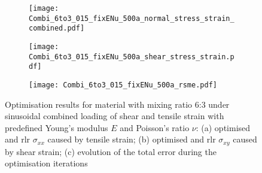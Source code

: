 \begin{figure}[H]
\centering
\begin{subfigure}[t]{0.495\textwidth}
    \centering
    \texttt{[image: Combi\_6to3\_015\_fixENu\_500a\_normal\_stress\_strain\_combined.pdf]}
    \caption{}
    \label{subfig:CombiTensileStressStrainCurve}
\end{subfigure}
\hfill
\begin{subfigure}[t]{0.495\textwidth}
    \centering
    \texttt{[image: Combi\_6to3\_015\_fixENu\_500a\_shear\_stress\_strain.pdf]}
    \caption{}
    \label{subfig:CombiShearStressStrain}
\end{subfigure}
\begin{subfigure}[t]{0.495\textwidth}
    \centering
    \texttt{[image: Combi\_6to3\_015\_fixENu\_500a\_rsme.pdf]}
    \caption{}
    \label{fig:combiRMSE}
\end{subfigure}
\caption{Optimisation results for material with mixing ratio 6:3 under sinusoidal combined loading of shear and tensile strain with predefined Young's modulus $E$ and Poisson's ratio $\nu$: (a) optimised and \acrfull{rlr} $\sigma_{xx}$ caused by tensile strain; (b) optimised and \acrfull{rlr} $\sigma_{xy}$ caused by shear strain; (c) evolution of the total error during the optimisation iterations}
\label{fig:CombiResults6to3}
\end{figure}


